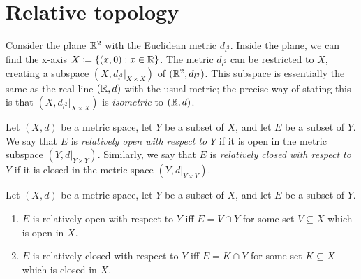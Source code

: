 \section{Relative topology}\label{sec:1.3}

\begin{note}
  Consider the plane \(\mathbb{R}^2\) with the Euclidean metric \(d_{l^2}\).
  Inside the plane, we can find the x-axis \(X \coloneqq \left\lbrace(x, 0) : x \in \mathbb{R}\right\rbrace\).
  The metric \(d_{l^2}\) can be restricted to \(X\), creating a subspace \((X, d_{l^2}|_{X \times X})\) of \((\mathbb{R}^2, d_{l^2})\).
  This subspace is essentially the same as the real line \((\mathbb{R}, d)\) with the usual metric;
  the precise way of stating this is that \((X, d_{l^2}|_{X \times X})\) is \emph{isometric} to \((\mathbb{R}, d)\).
\end{note}

\setcounter{thm}{2}
\begin{defn}\label{1.3.3}
  Let \((X, d)\) be a metric space, let \(Y\) be a subset of \(X\), and let \(E\) be a subset of \(Y\).
  We say that \(E\) is \emph{relatively open with respect to \(Y\)} if it is open in the metric subspace \((Y, d|_{Y \times Y})\).
  Similarly, we say that \(E\) is \emph{relatively closed with respect to \(Y\)} if it is closed in the metric space \((Y, d|_{Y \times Y})\).
\end{defn}

\begin{prop}\label{1.3.4}
  Let \((X, d)\) be a metric space, let \(Y\) be a subset of \(X\), and let \(E\) be a subset of \(Y\).
  \begin{enumerate}
    \item \(E\) is relatively open with respect to \(Y\) iff \(E = V \cap Y\) for some set \(V \subseteq X\) which is open in \(X\).
    \item \(E\) is relatively closed with respect to \(Y\) iff \(E = K \cap Y\) for some set \(K \subseteq X\) which is closed in \(X\).
  \end{enumerate}
\end{prop}

